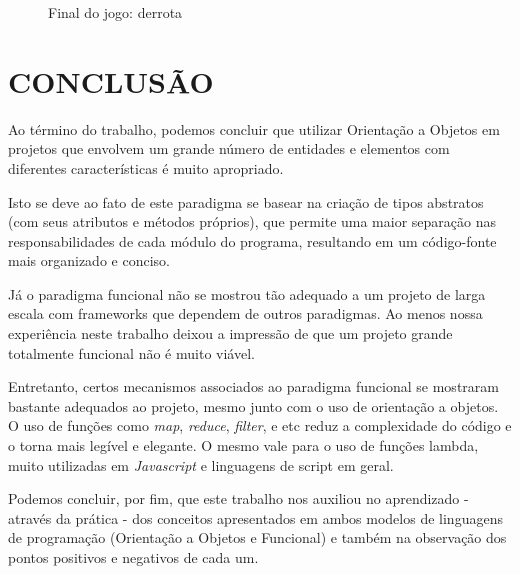 \documentclass[rel_mlp]{iiufrgs}
\begin{document}
\begin{figure}[htb]
    \centering
    \caption{Final do jogo: derrota}
    \label{fig:figura1}
\end{figure}

%
\chapter{CONCLUSÃO}

Ao término do trabalho, podemos concluir que utilizar Orientação a Objetos em projetos que envolvem um grande número de entidades e elementos com diferentes características é muito apropriado.

Isto se deve ao fato de este paradigma se basear na criação de tipos abstratos (com seus atributos e métodos próprios), que permite uma maior separação nas responsabilidades de cada módulo do programa, resultando em um código-fonte mais organizado e conciso.

Já o paradigma funcional não se mostrou tão adequado a um projeto de larga escala com frameworks que dependem de outros paradigmas. Ao menos nossa experiência neste trabalho deixou a impressão de que um projeto grande totalmente funcional não é muito viável.

Entretanto, certos mecanismos associados ao paradigma funcional se mostraram bastante adequados ao projeto, mesmo junto com o uso de orientação a objetos. O uso de funções como \textit{map}, \textit{reduce}, \textit{filter}, e etc reduz a complexidade do código e o torna mais legível e elegante. O mesmo vale para o uso de funções lambda, muito utilizadas em \textit{Javascript} e linguagens de script em geral.

Podemos concluir, por fim, que este trabalho nos auxiliou no aprendizado - através da prática - dos conceitos apresentados em ambos modelos de linguagens de programação (Orientação a Objetos e Funcional) e também na observação dos pontos positivos e negativos de cada um.

%

%

\end{document}
